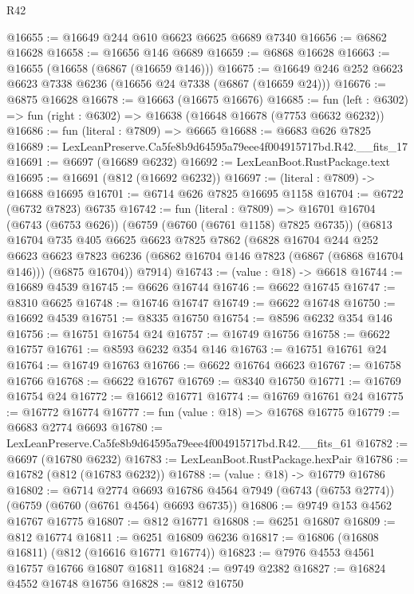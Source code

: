 \begin{lexlean}{R42}
\begin{coremodule}
{@16655 := @16649 @244 @610 @6623 @6625 @6689 @7340
@16656 := @6862 @16628
@16658 := @16656 @146 @6689
@16659 := @6868 @16628
@16663 := @16655 (@16658 (@6867 (@16659 @146)))
@16675 := @16649 @246 @252 @6623 @6623 @7338 @6236 (@16656 @24 @7338 (@6867 (@16659 @24)))
@16676 := @6875 @16628
@16678 := @16663 (@16675 @16676)
@16685 := fun (left : @6302) => fun (right : @6302) => @16638 (@16648 @16678 (@7753 @6632 @6232))
@16686 := fun (literal : @7809) => @6665
@16688 := @6683 @626 @7825
@16689 := LexLeanPreserve.Ca5fe8b9d64595a79eee4f004915717bd.R42.__fits_17
@16691 := @6697 (@16689 @6232)
@16692 := LexLeanBoot.RustPackage.text
@16695 := @16691 (@812 (@16692 @6232))
@16697 := (literal : @7809) -> @16688 @16695
@16701 := @6714 @626 @7825 @16695 @1158
@16704 := @6722 (@6732 @7823) @6735
@16742 := fun (literal : @7809) =>
  @16701
    @16704
    (@6743 (@6753 @626))
    (@6759 (@6760 (@6761 @1158) @7825 @6735))
    (@6813
      @16704
      @735
      @405
      @6625
      @6623
      @7825
      @7862
      (@6828
        @16704
        @244
        @252
        @6623
        @6623
        @7823
        @6236
        (@6862 @16704 @146 @7823 (@6867 (@6868 @16704 @146)))
        (@6875 @16704))
      @7914)
@16743 := (value : @18) -> @6618
@16744 := @16689 @4539
@16745 := @6626 @16744
@16746 := @6622 @16745
@16747 := @8310 @6625
@16748 := @16746 @16747
@16749 := @6622 @16748
@16750 := @16692 @4539
@16751 := @8335 @16750
@16754 := @8596 @6232 @354 @146
@16756 := @16751 @16754 @24
@16757 := @16749 @16756
@16758 := @6622 @16757
@16761 := @8593 @6232 @354 @146
@16763 := @16751 @16761 @24
@16764 := @16749 @16763
@16766 := @6622 @16764 @6623
@16767 := @16758 @16766
@16768 := @6622 @16767
@16769 := @8340 @16750
@16771 := @16769 @16754 @24
@16772 := @16612 @16771
@16774 := @16769 @16761 @24
@16775 := @16772 @16774
@16777 := fun (value : @18) => @16768 @16775
@16779 := @6683 @2774 @6693
@16780 := LexLeanPreserve.Ca5fe8b9d64595a79eee4f004915717bd.R42.__fits_61
@16782 := @6697 (@16780 @6232)
@16783 := LexLeanBoot.RustPackage.hexPair
@16786 := @16782 (@812 (@16783 @6232))
@16788 := (value : @18) -> @16779 @16786
@16802 := @6714
    @2774
    @6693
    @16786
    @4564
    @7949
    (@6743 (@6753 @2774))
    (@6759 (@6760 (@6761 @4564) @6693 @6735))
@16806 := @9749 @153 @4562 @16767 @16775
@16807 := @812 @16771
@16808 := @6251 @16807
@16809 := @812 @16774
@16811 := @6251 @16809 @6236
@16817 := @16806 (@16808 @16811) (@812 (@16616 @16771 @16774))
@16823 := @7976 @4553 @4561 @16757 @16766 @16807 @16811
@16824 := @9749 @2382
@16827 := @16824 @4552 @16748 @16756
@16828 := @812 @16750
}
\end{coremodule}
\end{lexlean}
